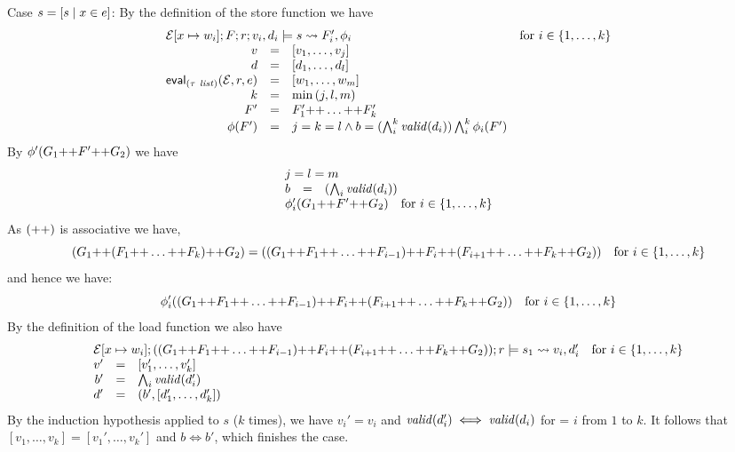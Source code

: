 {\begin{description}
\item{Case $s = [ s \mid x \in e ]$:}
By the definition of the store function we have
\[
\begin{array}{rcll}
\multicolumn{3}{l}{\store{\Env[x \mapsto w_i]}{F}{r}{v_i,d_i}{s}{F_i',\phi_i}} & \text{for}~i \in \{1,\dots,k\}\\
v &=& [v_1,\dots,v_j]\\
d &=& [d_1,\dots,d_l]\\
\eval{(\tau\ \mathit{list})}{\Env,r,e} &=& [w_1,\dots,w_m ]\\
k &=& \min{(j,l,m)}\\
F' &=& F_1' \FAppend \dots \FAppend F_k'\\
\phi(F') &=& j = k = l \wedge b = (\bigwedge_i^k \valid{d_i}) \bigwedge_i^k \phi_i(F')\\
\end{array}
\]
By $\phi'(G_1 \text{++} F' \text{++} G_2)$ we have
\[
\begin{array}{rcll}
\multicolumn{3}{l}{j = l = m}\\
b &=& (\bigwedge_i \valid{d_i})\\
\multicolumn{3}{l}{\phi_i'(G_1 \FAppend F' \FAppend G_2) \quad \text{for}~i \in \{1,\dots,k\}}\\
\end{array}
\]
%
As $(\text{++})$ is associative we have,
\[
(G_1\text{++} (F_1\text{++} \dots \text{++} F_k)\text{++} G_2) =
((G_1\text{++} F_1\text{++} \dots \text{++} F_{i-1}) \text{++} F_i \text{++} (F_{i+1} \text{++} \dots \text{++} F_k \text{++} G_2)) 
\quad \text{for}~i \in \{1,\dots,k\}
\]
and hence we have:
\[
\phi_i'((G_1\text{++} F_1\text{++} \dots \text{++} F_{i-1}) \text{++} F_i \text{++} (F_{i+1} \text{++} \dots \text{++} F_k \text{++} G_2)) 
\quad \text{for}~i \in \{1,\dots,k\}
\]
%
By the definition of the load function we also have 
\[ 
\begin{array}{rcll}
\multicolumn{3}{l}{\load{\Env[ x \mapsto w_i]}{((G_1\FAppend F_1\FAppend \dots \FAppend F_{i-1}) \FAppend F_i \FAppend (F_{i+1} \FAppend \dots \FAppend F_k \FAppend G_2))}{r}{s_1}{v_i,d_i'}} & \text{for}~i \in \{1,\dots,k\}\\
v' &=& [v_1',\dots,v_k']\\
b' &= &\bigwedge_i \valid{d_i'}\\
d' &=& (b',[d_1',\dots,d_k'])\\
\end{array}
\]
%
By the induction hypothesis applied to $s$ ($k$ times), we have $v_i'
= v_i$ and $\mathit{valid}(d_i') \iff \mathit{valid}(d_i)$ for = $i$ from $1$ to
$k$. It follows that $[v_1,\dots,v_k] = [v_1',\dots,v_k']$ and $b \iff
b'$, which finishes the case.


\end{description}}
